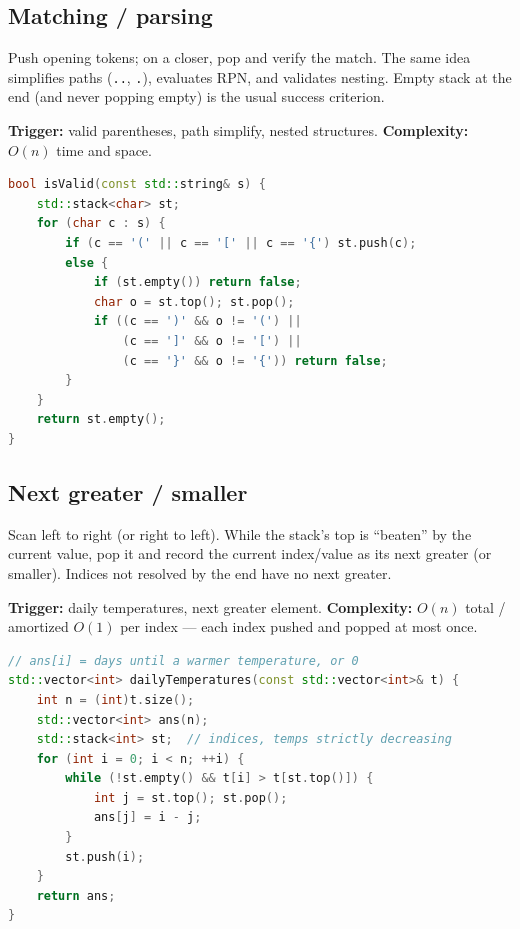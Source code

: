 \subsection{Matching / parsing}
\label{subsec:pat-stack-match}
Push opening tokens; on a closer, pop and verify the match. The same idea
simplifies paths (\texttt{..}, \texttt{.}), evaluates RPN, and validates nesting.
Empty stack at the end (and never popping empty) is the usual success criterion.

\textbf{Trigger:} valid parentheses, path simplify, nested structures.
\newline
\textbf{Complexity:} $O(n)$ time and space.

\begin{lstlisting}[language=C++]
bool isValid(const std::string& s) {
    std::stack<char> st;
    for (char c : s) {
        if (c == '(' || c == '[' || c == '{') st.push(c);
        else {
            if (st.empty()) return false;
            char o = st.top(); st.pop();
            if ((c == ')' && o != '(') ||
                (c == ']' && o != '[') ||
                (c == '}' && o != '{')) return false;
        }
    }
    return st.empty();
}
\end{lstlisting}

\subsection{Next greater / smaller}
\label{subsec:pat-next-greater}
Scan left to right (or right to left). While the stack's top is ``beaten'' by the
current value, pop it and record the current index/value as its next greater
(or smaller). Indices not resolved by the end have no next greater.

\textbf{Trigger:} daily temperatures, next greater element.
\newline
\textbf{Complexity:} $O(n)$ total / amortized $O(1)$ per index --- each index
pushed and popped at most once.

\begin{lstlisting}[language=C++]
// ans[i] = days until a warmer temperature, or 0
std::vector<int> dailyTemperatures(const std::vector<int>& t) {
    int n = (int)t.size();
    std::vector<int> ans(n);
    std::stack<int> st;  // indices, temps strictly decreasing
    for (int i = 0; i < n; ++i) {
        while (!st.empty() && t[i] > t[st.top()]) {
            int j = st.top(); st.pop();
            ans[j] = i - j;
        }
        st.push(i);
    }
    return ans;
}
\end{lstlisting}

